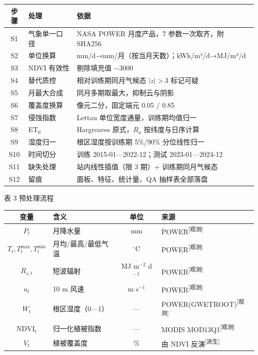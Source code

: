 \documentclass[11pt,a4paper]{ctexart}
\newcommand{\src}[1]{\textsuperscript{\scriptsize [#1]}}
\begin{document}
\begin{table}[H]\centering\small\setlength{\parskip}{1pt}
\begin{tabularx}{\textwidth}{|c|X|X|}
\toprule
步骤 & 处理 & 依据\\
\midrule
S1 & 气象单一口径 & NASA POWER 月度产品，7 参数一次取齐，附 SHA256\\
S2 & 单位换算 & mm/d→mm/月（按当月天数）；kWh/m²/d→MJ/m²/d\\
S3 & NDVI 有效性 & 剔除填充值 −3000\\
S4 & 替代质控 & 相对训练期同月气候态 $|z|>3$ 标记可疑\\
S5 & 月最大合成 & 同月多期取最大，抑制云与阴影\\
S6 & 覆盖度换算 & 像元二分，固定端元 0.05 / 0.85\\
S7 & 侵蚀指数 & Lettau 单位宽度通量，训练期均值归一\\
S8 & ET$_0$ & Hargreaves 原式，$R_a$ 按纬度与日序计算\\
S9 & 湿度归一 & 根区湿度按训练期 5\%/90\% 分位线性归一\\
S10 & 时间切分 & 训练 2015-01—2022-12；测试 2023-01—2024-12\\
S11 & 缺失处理 & 站内线性插值（限 3 期）+ 训练期同月气候态\\
S12 & 留痕 & 面板、特征、统计量、QA 抽样表全部落盘\\
\bottomrule
\end{tabularx}
\begin{center}\small 表 3  预处理流程\end{center}
\end{table}\begin{table}[H]\centering\small\setlength{\parskip}{1pt}
\begin{tabularx}{\textwidth}{|c|X|c|X|}
\toprule
变量 & 含义 & 单位 & 来源\\
\midrule
$P_t$ & 月降水量 & mm & POWER\src{观测}\\
$T_t,T^{\max}_t,T^{\min}_t$ & 月均/最高/最低气温 & $^\circ$C & POWER\src{观测}\\
$R_{s,t}$ & 短波辐射 & MJ m$^{-2}$ d$^{-1}$ & POWER\src{观测}\\
$u_t$ & 10 m 风速 & m s$^{-1}$ & POWER\src{观测}\\
$W_t$ & 根区湿度（0—1） & — & POWER(GWETROOT)\src{观测}\\
$\mathrm{NDVI}_t$ & 归一化植被指数 & — & MODIS MOD13Q1\src{观测}\\
$V_t$ & 植被覆盖度 & \% & 由 NDVI 反演\src{派生}\\

\end{tabularx}
\end{table}
\end{document}
